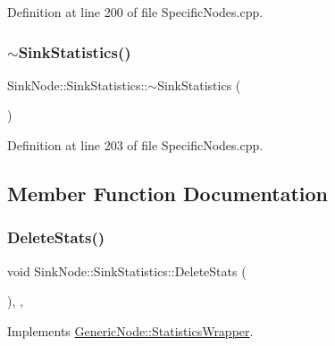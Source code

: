 Definition at line 200 of file Specific\+Nodes.\+cpp.

\mbox{\label{class_sink_node_1_1_sink_statistics_af8f01207bb1d835b89267a7857c08cb6}} 
\subsubsection{\texorpdfstring{$\sim$\+Sink\+Statistics()}{~SinkStatistics()}}
{\footnotesize\ttfamily Sink\+Node\+::\+Sink\+Statistics\+::$\sim$\+Sink\+Statistics (\begin{DoxyParamCaption}{ }\end{DoxyParamCaption})\hspace{0.3cm}{\ttfamily [inline]}}



Definition at line 203 of file Specific\+Nodes.\+cpp.



\subsection{Member Function Documentation}
\mbox{\label{class_sink_node_1_1_sink_statistics_a9bd64cbc1cbe5f75ae5bd4971a3453b0}} 
\subsubsection{\texorpdfstring{Delete\+Stats()}{DeleteStats()}}
{\footnotesize\ttfamily void Sink\+Node\+::\+Sink\+Statistics\+::\+Delete\+Stats (\begin{DoxyParamCaption}{ }\end{DoxyParamCaption})\hspace{0.3cm}{\ttfamily [inline]}, {\ttfamily [override]}, {\ttfamily [virtual]}}



Implements \hyperlink{class_generic_node_1_1_statistics_wrapper_a08f3642bccd77ccf4d7a8b7010559e1c}{Generic\+Node\+::\+Statistics\+Wrapper}.



